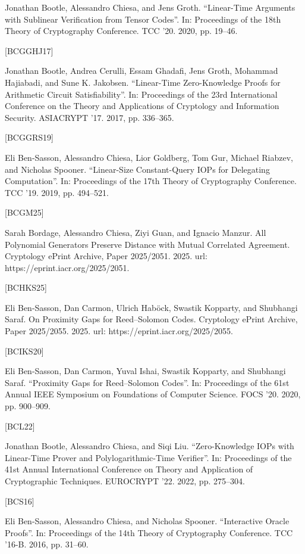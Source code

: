 \documentclass[11pt]{article}
\begin{document}
Jonathan Bootle, Alessandro Chiesa, and Jens Groth. “Linear-Time Arguments with Sublinear Verification from Tensor Codes”. In: Proceedings of the 18th Theory of Cryptography
Conference. TCC ’20. 2020, pp. 19–46.

[BCGGHJ17]

Jonathan Bootle, Andrea Cerulli, Essam Ghadafi, Jens Groth, Mohammad Hajiabadi, and
Sune K. Jakobsen. “Linear-Time Zero-Knowledge Proofs for Arithmetic Circuit Satisfiability”. In: Proceedings of the 23rd International Conference on the Theory and Applications
of Cryptology and Information Security. ASIACRYPT ’17. 2017, pp. 336–365.

[BCGGRS19]

Eli Ben-Sasson, Alessandro Chiesa, Lior Goldberg, Tom Gur, Michael Riabzev, and Nicholas
Spooner. “Linear-Size Constant-Query IOPs for Delegating Computation”. In: Proceedings
of the 17th Theory of Cryptography Conference. TCC ’19. 2019, pp. 494–521.

[BCGM25]

Sarah Bordage, Alessandro Chiesa, Ziyi Guan, and Ignacio Manzur. All Polynomial Generators Preserve Distance with Mutual Correlated Agreement. Cryptology ePrint Archive,
Paper 2025/2051. 2025. url: https://eprint.iacr.org/2025/2051.

[BCHKS25]

Eli Ben-Sasson, Dan Carmon, Ulrich Haböck, Swastik Kopparty, and Shubhangi Saraf. On
Proximity Gaps for Reed–Solomon Codes. Cryptology ePrint Archive, Paper 2025/2055.
2025. url: https://eprint.iacr.org/2025/2055.

[BCIKS20]

Eli Ben-Sasson, Dan Carmon, Yuval Ishai, Swastik Kopparty, and Shubhangi Saraf. “Proximity Gaps for Reed–Solomon Codes”. In: Proceedings of the 61st Annual IEEE Symposium
on Foundations of Computer Science. FOCS ’20. 2020, pp. 900–909.

[BCL22]

Jonathan Bootle, Alessandro Chiesa, and Siqi Liu. “Zero-Knowledge IOPs with Linear-Time
Prover and Polylogarithmic-Time Verifier”. In: Proceedings of the 41st Annual International
Conference on Theory and Application of Cryptographic Techniques. EUROCRYPT ’22.
2022, pp. 275–304.

[BCS16]

Eli Ben-Sasson, Alessandro Chiesa, and Nicholas Spooner. “Interactive Oracle Proofs”. In:
Proceedings of the 14th Theory of Cryptography Conference. TCC ’16-B. 2016, pp. 31–60.
\end{document}
